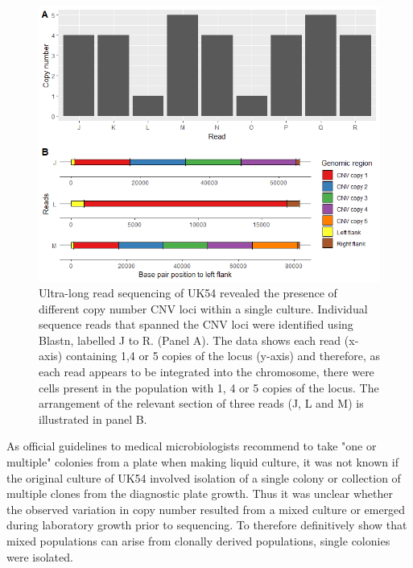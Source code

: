 \documentclass{article}
\begin{document}
\begin{figure}[h!]
\centering
\includegraphics[width=\textwidth{}]{Chapter_2/combined UK54.png}
\caption{ Ultra-long read sequencing of UK54 revealed the presence of different copy number CNV loci within a single culture. Individual sequence reads that spanned the CNV loci were identified using Blastn, labelled J to R. (Panel A). The data shows each read (x-axis) containing 1,4 or 5 copies of the locus (y-axis) and therefore, as each read appears to be integrated into the chromosome, there were cells present in the population with 1, 4 or 5 copies of the locus. The arrangement of the relevant section of three reads (J, L and M) is illustrated in panel B.}
\label{fig:CDC_discrep}
\end{figure}
As official guidelines to medical microbiologists recommend to take "one or multiple" colonies from a plate when making liquid culture, it was not known if the original culture of UK54 involved isolation of a single colony or collection of multiple clones from the diagnostic plate growth. Thus it was unclear whether the observed variation in copy number resulted from a mixed culture or emerged during laboratory growth prior to sequencing.  To therefore definitively show that mixed populations can arise from clonally derived populations, single colonies were isolated.

\end{document}
